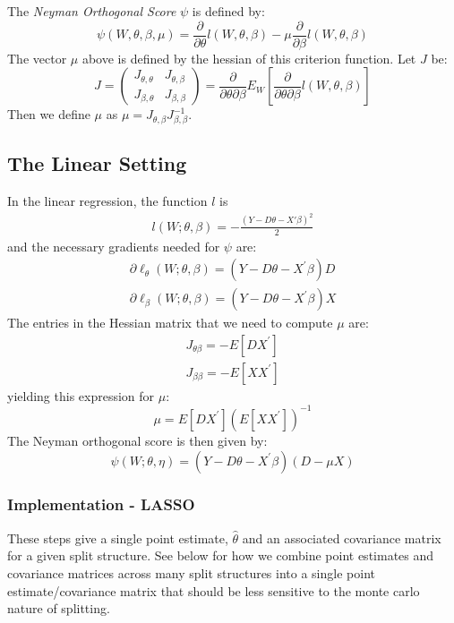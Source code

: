 \documentclass[11pt]{article}
\begin{document}
The \textit{Neyman Orthogonal Score} $\psi$ is defined by:
\begin{equation*}
	\psi(W, \theta, \beta, \mu) = \frac{\partial}{\partial \theta}l(W, \theta, \beta) - \mu \frac{\partial}{\partial \beta}l(W, \theta, \beta)
\end{equation*}
The vector $\mu$ above is defined by the hessian of this criterion function.  Let $J$ be:
\begin{equation*}
	J =
	\begin{pmatrix}
		J_{\theta, \theta} & J_{\theta, \beta} \\
		J_{\beta, \theta} & J_{\beta, \beta}
	\end{pmatrix}
	= \frac{\partial}{\partial \theta \partial \beta} E_W\left[\frac{\partial}{\partial \theta \partial \beta} l(W, \theta, \beta)\right]
\end{equation*}
Then we define $\mu$ as $\mu = J_{\theta, \beta} J_{\beta, \beta}^{-1}$.


\subsection{The Linear Setting}
In the linear regression, the function $l$ is
\begin{gather*}
	l(W; \theta, \beta) = -\frac{(Y - D\theta - X'\beta)^2}{2}
\end{gather*}
and the necessary gradients needed for $\psi$ are:
\begin{gather*}
	\partial \ell_{\theta}(W ; \theta, \beta)=\left(Y-D \theta-X^{\prime} \beta\right) D \\
  \partial \ell_{\beta}(W ; \theta, \beta)=\left(Y-D \theta-X^{\prime} \beta\right) X
\end{gather*}
The entries in the Hessian matrix that we need to compute $\mu$ are:
\begin{gather*}
	J_{\theta \beta}=-E\left[D X^{\prime}\right] \\
  J_{\beta \beta}=-E\left[X X^{\prime}\right]
\end{gather*}
yielding this expression for $\mu$:
$$	\mu = E\left[D X^{\prime}\right]\left(E\left[X X^{\prime}\right]\right)^{-1}$$
The Neyman orthogonal score is then given by:
$$ \psi(W ; \theta, \eta)=\left(Y-D \theta-X^{\prime} \beta\right)(D-\mu X) $$

\subsubsection{Implementation - LASSO}
These steps give a single point estimate, $\hat{\theta}$ and an associated covariance matrix for a given split structure.  See below for how we combine point estimates and covariance matrices across many split structures into a single point estimate/covariance matrix that should be less sensitive to the monte carlo nature of splitting.
\end{document}
